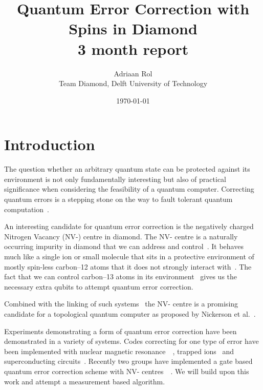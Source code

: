 
\def\bibliostyle{plain}
\def\bibliocommand{}
\def\mytitle{3 Month Report}
\def\myauthor{M.A.Rol}
\def\latexmode{memoir}


\title{\huge{Quantum Error Correction with Spins in Diamond}  \\  \large{3 month report}}
\author{Adriaan Rol \\  Team Diamond, Delft University of Technology}
\date{\today}
\maketitle 
\newpage
\tableofcontents
\mainmatter


\chapter{Introduction}
\label{introduction}

The question whether an arbitrary quantum state can be protected against its environment is not only fundamentally interesting but also of practical significance when considering the feasibility of a quantum computer. Correcting quantum errors is a stepping stone on the way to fault tolerant quantum computation~\citep{Nielsen2010}. 

An interesting candidate for quantum error correction is the negatively charged Nitrogen Vacancy (NV-) centre in diamond. The NV- centre is a naturally occurring impurity in diamond that we can address and control~\citep{Childress2013}. It behaves much like a single ion or small molecule that sits in a protective environment of mostly spin-less carbon--12 atoms that it does not strongly interact with~\citep{Bernien2014}. The fact that we can control carbon--13 atoms in its environment~\citep{Taminiau2012} gives us the necessary extra qubits to attempt quantum error correction. 

Combined with the linking of such systems~\citep{Bernien2013} the NV- centre is a promising candidate for a topological quantum computer as proposed by Nickerson et al.~\citep{Nickerson2013}. 

Experiments demonstrating a form of quantum error correction have been demonstrated in a variety of systems. Codes correcting for one type of error have been implemented with nuclear magnetic resonance~\citep{Cory1998}~\citep{Moussa2011}, trapped ions~\citep{Schindler2011} and superconducting circuits~\citep{Reed2012}. Recently two groups have implemented a gate based quantum error correction scheme with NV- centres~\citep{Taminiau2014}~\citep{Waldherr2014}. We will build upon this work and attempt a measurement based algorithm. 


